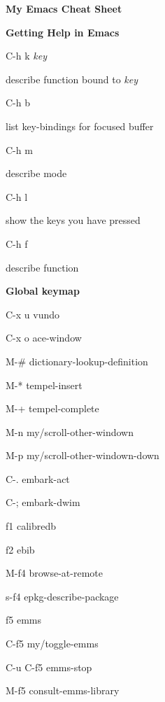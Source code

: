 \documentclass[10pt]{article}
\renewcommand\section[1]{\bigskip\par\textbf{\color{heading}\large#1}\smallskip}
\newcommand\humanreadable[1]{{\par\color{default}\small\sffamily#1}}
\newcommand\meta[1]{\textlangle\textit{#1}\textrangle}
\begin{document}
\author{Jousimies}
\begin{multicols}{4}

  \setlength{\columnsep}{1cm}
  \begin{center}
    \LARGE\color{heading}\textbf{My Emacs Cheat Sheet}
  \end{center}

  \section{Getting Help in Emacs}
  \begin{keylist}
    \item[C-h k \meta{key}] \humanreadable{describe function bound to \meta{key}}
    \item[C-h b] \humanreadable{list key-bindings for focused buffer}
    \item[C-h m] \humanreadable{describe mode}
    \item[C-h l] \humanreadable{show the keys you have pressed}
    \item[C-h f] \humanreadable{describe function}
  \end{keylist}

  \section{Global keymap}
  \begin{keylist}
    \item[C-x u] vundo
    \item[C-x o] ace-window
    \item[M-\#] dictionary-lookup-definition
    \item[M-*] tempel-insert
    \item[M-+] tempel-complete
    \item[M-n] my/scroll-other-windown
    \item[M-p] my/scroll-other-windown-down
    \item[C-.] embark-act
    \item[C-;] embark-dwim

    \item[f1] calibredb
    \item[f2] ebib

    \item[M-f4] browse-at-remote
    \item[s-f4] epkg-describe-package

    \item[f5] emms
    \item[C-f5] my/toggle-emms
    \item[C-u C-f5] emms-stop
    \item[M-f5] consult-emms-library


\end{keylist}
\end{multicols}
\end{document}
